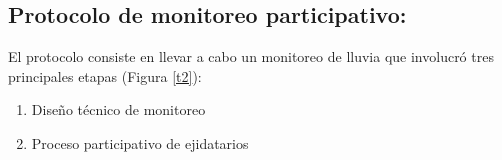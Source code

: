     
    
    
\subsection{Protocolo de monitoreo participativo:}

El protocolo consiste en llevar a cabo un monitoreo de lluvia que involucró tres principales etapas (Figura \ref{t2}): 
\begin{enumerate}
  \item Diseño técnico de monitoreo
  \item Proceso participativo de ejidatarios
\end{enumerate}

